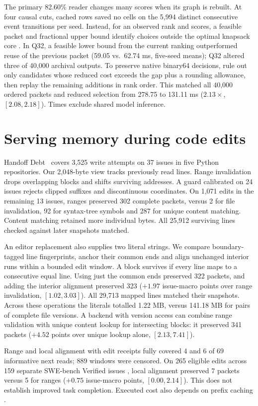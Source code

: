 \documentclass[conference]{IEEEtran}
\begin{document}
The primary 82.60\% reader changes many scores when its graph is rebuilt. At four causal cuts, cached rows saved no cells on the 5,994 distinct consecutive event transitions per seed. Instead, for an observed rank and scores, a feasible packet and fractional upper bound identify choices outside the optimal knapsack core \cite{coreknap}. In Q32, a feasible lower bound from the current ranking outperformed reuse of the previous packet (59.05 vs.\ 62.74 ms, five-seed means); Q32 altered three of 40,000 archival outputs. To preserve native binary64 decisions, rule out only candidates whose reduced cost exceeds the gap plus a rounding allowance, then replay the remaining additions in rank order. This matched all 40,000 ordered packets and reduced selection from 278.75 to 131.11 ms ($2.13\times$, $[2.08,2.18]$). Times exclude shared model inference.

\section{Serving memory during code edits}
Handoff Debt~\cite{handoff} covers 3,525 write attempts on 37 issues in five Python repositories. Our 2,048-byte view tracks previously read lines. Range invalidation drops overlapping blocks and shifts surviving addresses. A guard calibrated on 24 issues rejects clipped suffixes and discontinuous coordinates. On 1,071 edits in the remaining 13 issues, ranges preserved 302 complete packets, versus 2 for file invalidation, 92 for syntax-tree symbols and 287 for unique content matching. Content matching retained more individual bytes. All 25,912 surviving lines checked against later snapshots matched.

An editor replacement also supplies two literal strings. We compare boundary-tagged line fingerprints, anchor their common ends and align unchanged interior runs within a bounded edit window. A block survives if every line maps to a consecutive equal line. Using just the common ends preserved 322 packets, and adding the interior alignment preserved 323 ($+1.97$ issue-macro points over range invalidation, $[1.02,3.03]$). All 29,713 mapped lines matched their snapshots. Across these operations the literals totalled 1.22 MB, versus 141.18 MB for pairs of complete file versions. A backend with version access can combine range validation with unique content lookup for intersecting blocks: it preserved 341 packets ($+4.52$ points over unique lookup alone, $[2.13,7.41]$).

Range and local alignment with edit receipts fully covered 4 and 6 of 69 informative next reads; 889 windows were censored. On 265 eligible edits across 159 separate SWE-bench Verified issues \cite{swe-run}, local alignment preserved 7 packets versus 5 for ranges ($+0.75$ issue-macro points, $[0.00,2.14]$). This does not establish improved task completion. Executed cost also depends on prefix caching \cite{physical}.
\end{document}
